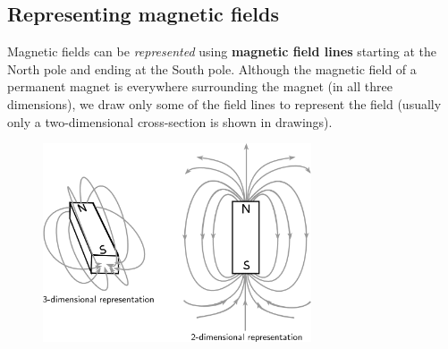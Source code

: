 {\begin{mdframed}[linewidth=4, leftmargin=40, rightmargin=40]
\begin{exercise}
    \end{exercise}
    \end{mdframed}
    }
    \noindent
  
      
      \label{m37830*uid18}
            \subsection{ Representing magnetic fields}
            \nopagebreak
            
        
        \label{m37830*id128970}Magnetic fields can be \textsl{represented} using \textbf{magnetic field lines} starting at the North pole and ending at the South pole. Although the magnetic field of a permanent magnet is everywhere surrounding the
magnet (in all three dimensions), we draw only some of the field lines to represent the field
(usually only a two-dimensional cross-section is shown in drawings).\par 
        \label{m37830*id128986}
          
    \setcounter{subfigure}{0}


	\begin{figure}[H] %
    \begin{center}
    \label{m37830*id128989!!!underscore!!!media}\label{m37830*id128989!!!underscore!!!printimage}\includegraphics[width=300px]{col11305.imgs/m37830_PG10C7_008.png} %
        
      \vspace{2pt}
    \vspace{.1in}
    
    \end{center}

 \end{figure}   

    \addtocounter{footnote}{-0}
    
